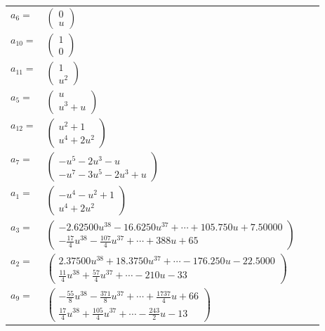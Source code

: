 \documentclass[1p]{elsarticle_modified}
\theoremstyle{definition}
\begin{document}
\begin{tabular}{m{7pt} m{180pt} m{7pt} m{180pt} }
\flushright $a_{6}=$&$\begin{pmatrix}0\\u\end{pmatrix}$ \\
\flushright $a_{10}=$&$\begin{pmatrix}1\\0\end{pmatrix}$ \\
\flushright $a_{11}=$&$\begin{pmatrix}1\\u^2\end{pmatrix}$ \\
\flushright $a_{5}=$&$\begin{pmatrix}u\\u^3+u\end{pmatrix}$ \\
\flushright $a_{12}=$&$\begin{pmatrix}u^2+1\\u^4+2 u^2\end{pmatrix}$ \\
\flushright $a_{7}=$&$\begin{pmatrix}- u^5-2 u^3- u\\- u^7-3 u^5-2 u^3+u\end{pmatrix}$ \\
\flushright $a_{1}=$&$\begin{pmatrix}- u^4- u^2+1\\u^4+2 u^2\end{pmatrix}$ \\
\flushright $a_{3}=$&$\begin{pmatrix}-2.62500 u^{38}-16.6250 u^{37}+\cdots+105.750 u+7.50000\\-\frac{17}{4} u^{38}-\frac{107}{4} u^{37}+\cdots+388 u+65\end{pmatrix}$ \\
\flushright $a_{2}=$&$\begin{pmatrix}2.37500 u^{38}+18.3750 u^{37}+\cdots-176.250 u-22.5000\\\frac{11}{4} u^{38}+\frac{57}{4} u^{37}+\cdots-210 u-33\end{pmatrix}$ \\
\flushright $a_{9}=$&$\begin{pmatrix}-\frac{55}{8} u^{38}-\frac{371}{8} u^{37}+\cdots+\frac{1737}{4} u+66\\\frac{17}{4} u^{38}+\frac{105}{4} u^{37}+\cdots-\frac{243}{2} u-13\end{pmatrix}$ \\

\end{tabular}
\end{document}
